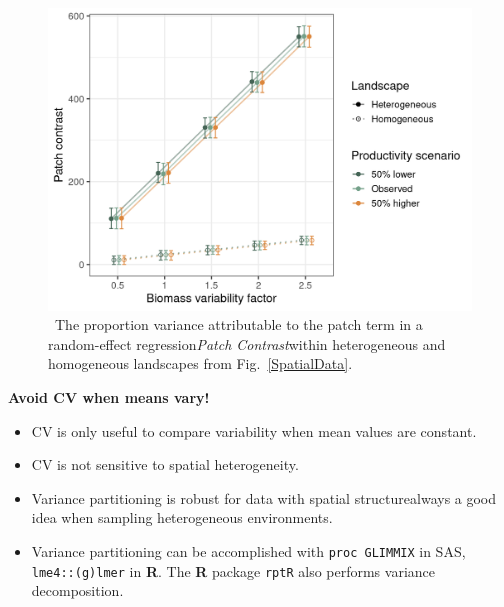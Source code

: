 \begin{frame}[t]
\begin{columns}[t]
\begin{column}{\onecolwid}
\begin{figure}
	\begin{center}
		\includegraphics[width=1.5\maxwidth]{figure/VariancePartitioning}
		\caption{~The proportion variance attributable to the patch term in a random-effect regression\textemdash\emph{Patch Contrast}\textemdash within heterogeneous and homogeneous landscapes from Fig.~\ref{SpatialData}. }
		\label{VariancePartitioning}
	\end{center}
\end{figure}
	
\begin{alertblock}{\textbf{Avoid CV when means vary!}}

\begin{itemize}
\item CV is only useful to compare variability when mean values are constant. 
\item CV is not sensitive to spatial heterogeneity.
\item {Variance partitioning} is robust for data with spatial structure\textemdash always a good idea when sampling heterogeneous environments. 
\item Variance partitioning can be accomplished with \texttt{proc GLIMMIX} in SAS, \texttt{lme4::(g)lmer} in \textbf{R}. The \textbf{R} package \texttt{rptR} also performs variance decomposition.
\end{itemize}

\end{alertblock}

\end{column} %

\end{columns} %

\end{frame} %


